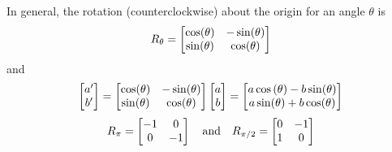 \documentclass[pdf,9pt]{beamer}
\begin{document}
\begin{frame}[fragile]
\begin{remark}
    In general, the rotation (counterclockwise) about the origin for an angle
    $\theta$ is
    \begin{align*}
	R_\theta =
	\begin{bmatrix} \cos(\theta) & -\sin(\theta)\cr
	\sin(\theta) & \cos(\theta) \end{bmatrix}
    \end{align*}
    and
    \pause
    \begin{align*}
        \begin{bmatrix} a'\cr b'\end{bmatrix}  =
	\begin{bmatrix} \cos(\theta) & -\sin(\theta)\cr
	\sin(\theta) & \cos(\theta) \end{bmatrix}
        \begin{bmatrix} a\cr b\end{bmatrix}
	=
	\begin{bmatrix} a\cos\left(\theta\right) - b\sin(\theta) \cr a
	\sin(\theta) + b\cos(\theta) \end{bmatrix}
    \end{align*}
    \pause
    \vspace{1em}
    \begin{align*}
	R_{\pi}   = \begin{bmatrix} -1&0\cr 0& -1  \end{bmatrix} \quad\text{and}\quad
	R_{\pi/2} = \begin{bmatrix} 0&-1\cr 1& 0  \end{bmatrix}
    \end{align*}
\end{remark}
\end{frame}
\end{document}

